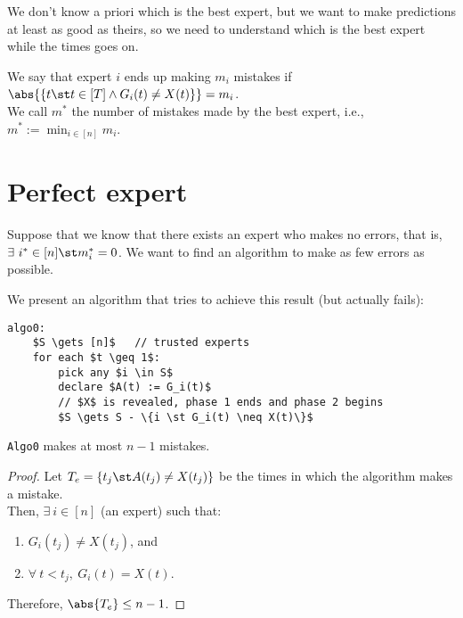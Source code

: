 \begin{obs}
    We don't know a priori which is the best expert, but we want to make predictions at least as good as theirs, so we need to understand which is the best expert while the times goes on.
\end{obs}

We say that expert $i$ ends up making $m_i$ mistakes if $\abs{\{ t \st t \in [T] \wedge G_i(t) \neq X(t) \}} = m_i$.\\
We call $m^*$ the number of mistakes made by the best expert, i.e., $m^* := \min_{i \in [n]} m_i$.

\section{Perfect expert}\label{sec:perfect-expert}

Suppose that we know that there exists an expert who makes no errors, that is, $\exists\ i^* \in [n] \st m_i^* = 0$. We want to find an algorithm to make as few errors as possible.

We present an algorithm that tries to achieve this result (but actually fails):
\begin{lstlisting}[caption={Algo 0}, label={lst:exp-algo0}]
algo0:
    $S \gets [n]$   // trusted experts
    for each $t \geq 1$:
        pick any $i \in S$
        declare $A(t) := G_i(t)$
        // $X$ is revealed, phase 1 ends and phase 2 begins
        $S \gets S - \{i \st G_i(t) \neq X(t)\}$
\end{lstlisting}

\begin{lem}\label{lem:exp-algo0-errors}
    \texttt{Algo0} makes at most $n-1$ mistakes.
\end{lem}
\begin{proof}
    Let $T_e = \{t_j \st A(t_j) \neq X(t_j)\}$ be the times in which the algorithm makes a mistake.\\
    Then, $\exists\ i \in [n]$ (an expert) such that:
    \begin{enumerate}
        \item $G_i(t_j) \neq X(t_j)$, and
        \item $\forall\ t < t_j,\ G_i(t) = X(t)$.
    \end{enumerate}
    Therefore, $\abs{T_e} \leq n-1$.
\end{proof}

